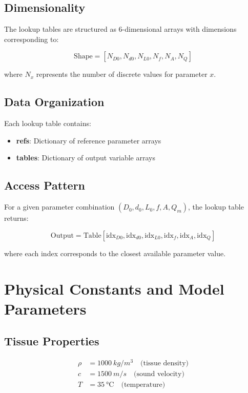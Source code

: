 \documentclass[11pt,a4paper]{article}
\begin{document}
\begin{table}[h!]
\subsection{Dimensionality}

The lookup tables are structured as 6-dimensional arrays with dimensions corresponding to:

\begin{equation}
\text{Shape} = [N_{D0}, N_{d0}, N_{L0}, N_f, N_A, N_Q]
\end{equation}

where $N_x$ represents the number of discrete values for parameter $x$.

\subsection{Data Organization}

Each lookup table contains:
\begin{itemize}
    \item \textbf{refs}: Dictionary of reference parameter arrays
    \item \textbf{tables}: Dictionary of output variable arrays
\end{itemize}

\subsection{Access Pattern}

For a given parameter combination $(D_0, d_0, L_0, f, A, Q_m)$, the lookup table returns:

\begin{equation}
\text{Output} = \text{Table}[\text{idx}_{D0}, \text{idx}_{d0}, \text{idx}_{L0}, \text{idx}_f, \text{idx}_A, \text{idx}_Q]
\end{equation}

where each index corresponds to the closest available parameter value.

\section{Physical Constants and Model Parameters}

\subsection{Tissue Properties}
\begin{align}
\rho &= \SI{1000}{kg/m^3} \quad \text{(tissue density)} \\
c &= \SI{1500}{m/s} \quad \text{(sound velocity)} \\
T &= \SI{35}{\celsius} \quad \text{(temperature)}
\end{align}


\end{table}
\end{document}
